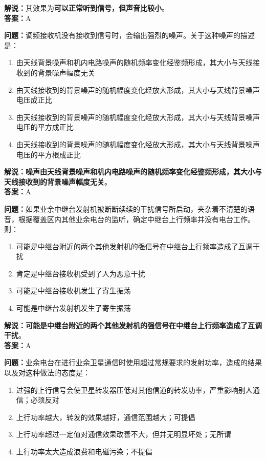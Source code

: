 \textbf{解说：}其效果为\textbf{可以正常听到信号，但声音比较小}。\\\textbf{答案：}A%


\textbf{问题：}调频接收机没有接收到信号时，会输出强烈的噪声。关于这种噪声的描述是：

\begin{enumerate}[label=\Alph*), leftmargin=1cm]
	\item 由天线背景噪声和机内电路噪声的随机频率变化经鉴频形成，其大小与天线接收到的背景噪声幅度无关
	\item 由天线接收到的背景噪声的随机幅度变化经放大形成，其大小与天线背景噪声电压成正比
	\item 由天线接收到的背景噪声的随机幅度变化经放大形成，其大小与天线背景噪声电压的平方成正比
	\item 由天线接收到的背景噪声的随机幅度变化经放大形成，其大小与天线背景噪声电压的平方根成正比
\end{enumerate}

\textbf{解说：噪声由天线背景噪声和机内电路噪声的随机频率变化经鉴频形成，其大小与天线接收到的背景噪声幅度无关}。\\\textbf{答案：}A%


\textbf{问题：}如果业余中继台发射机被断断续续的干扰信号所启动，夹杂着不清楚的语音，根据覆盖区内其他业余电台的监听，确定中继台上行频率并没有电台工作。则：

\begin{enumerate}[label=\Alph*), leftmargin=1cm]
	\item 可能是中继台附近的两个其他发射机的强信号在中继台上行频率造成了互调干扰
	\item 肯定是中继台接收机受到了人为恶意干扰
	\item 可能是中继台接收机发生了寄生振荡
	\item 可能是中继台发射机发生了寄生振荡
\end{enumerate}

\textbf{解说：可能是中继台附近的两个其他发射机的强信号在中继台上行频率造成了互调干扰}。\\\textbf{答案：}A%


\textbf{问题：}业余电台在进行业余卫星通信时使用超过常规要求的发射功率，造成的结果以及对这种做法的态度是：

\begin{enumerate}[label=\Alph*), leftmargin=1cm]
	\item 过强的上行信号会使卫星转发器压低对其他信道的转发功率，严重影响别人通信；必须反对
	\item 上行功率越大，转发的效果越好，通信范围越大；可提倡
	\item 上行功率超过一定值对通信效果改善不大，但并无明显坏处；无所谓
	\item 上行功率太大造成浪费和电磁污染；不提倡
\end{enumerate}


